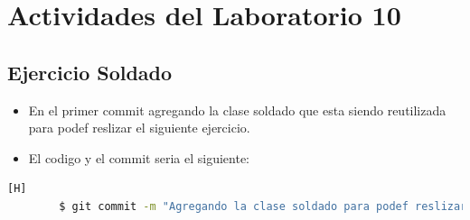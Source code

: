\documentclass{article}
\begin{document}
	\section{Actividades del Laboratorio 10}

	\subsection{Ejercicio Soldado}
	\begin{itemize}	
		\item En el primer commit agregando la clase soldado que esta siendo reutilizada para podef reslizar el siguiente ejercicio.
		\item El codigo y el commit seria el siguiente:
	\end{itemize}	
	\begin{lstlisting}[language=bash,caption={Commit}][H]
		$ git commit -m "Agregando la clase soldado para podef reslizar el siguiente ejercicio "
	\end{lstlisting}	
\end{document}
